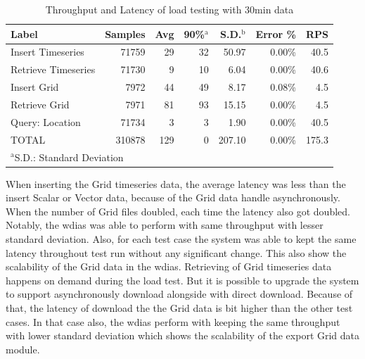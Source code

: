 \documentclass[conference]{IEEEtran}
\begin{document}
\begin{table}[tb!]
\caption{ Throughput and Latency of load testing with 30min data}
\begin{center}
\begin{adjustbox}{width=0.45\textwidth}
\begin{tabular}{|l|r|r|r|r|r|r|}
\hline
\textbf{Label} & \textbf{Samples} & \textbf{Avg} & \textbf{90\%$^{\mathrm{a}}$} & \textbf{S.D.$^{\mathrm{b}}$} & \textbf{Error \%} & \textbf{RPS} \\ \hline
Insert Timeseries & 71759 & 29 & 32 & 50.97 & 0.00\% & 40.5 \\ \hline
Retrieve Timeseries & 71730 & 9 & 10 & 6.04 & 0.00\% & 40.6 \\ \hline
Insert Grid & 7972 & 44 & 49 & 8.17 & 0.08\% & 4.5 \\ \hline
Retrieve Grid & 7971 & 81 & 93 & 15.15 & 0.00\% & 4.5 \\ \hline
Query: Location & 71734 & 3 & 3 & 1.90 & 0.00\% & 40.5 \\ \hline
TOTAL & 310878 & 129 & 0 & 207.10 & 0.00\% & 175.3 \\ \hline
\multicolumn{4}{l}{$^{\mathrm{a}}$S.D.: Standard Deviation}{$^{\mathrm{b}}$90\%: 90\% percentile}
\end{tabular}
\end{adjustbox}
\label{ptab:obs_all_30_min_summary_throughput}
\end{center}
\end{table}

When inserting the Grid timeseries data, the average latency was less than the insert Scalar or Vector data, because of the Grid data handle asynchronously. When the number of Grid files doubled, each time the latency also got doubled. Notably, the \acrshort{wdias} was able to perform with same throughput with lesser standard deviation. Also, for each test case the system was able to kept the same latency throughout test run without any significant change. This also show the scalability of the Grid data in the \acrshort{wdias}.
Retrieving of Grid timeseries data happens on demand during the load test. But it is possible to upgrade the system to support asynchronously download alongside with direct download. Because of that, the latency of download the the Grid data is bit higher than the other test cases. In that case also, the \acrshort{wdias} perform with keeping the same throughput with lower standard deviation which shows the scalability of the export Grid data module.
\end{document}
